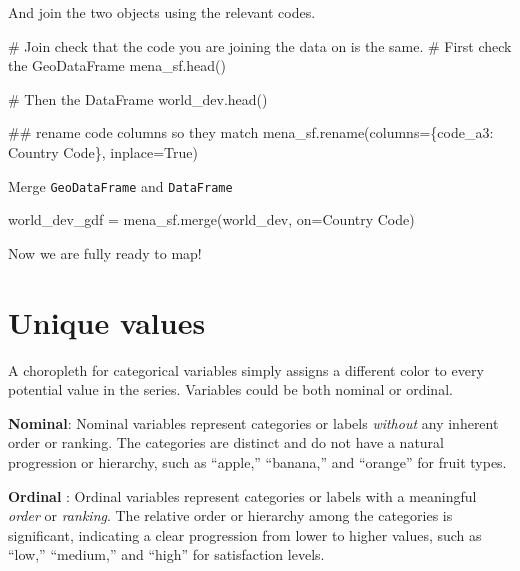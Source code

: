 \documentclass[
  letterpaper,
  DIV=11,
  numbers=noendperiod]{scrreprt}
\newenvironment{Shaded}{\begin{snugshade}}{\end{snugshade}}
\newcommand{\CommentTok}[1]{\textcolor[rgb]{0.37,0.37,0.37}{#1}}
\newcommand{\NormalTok}[1]{\textcolor[rgb]{0.00,0.23,0.31}{#1}}
\newcommand{\OperatorTok}[1]{\textcolor[rgb]{0.37,0.37,0.37}{#1}}
\newcommand{\StringTok}[1]{\textcolor[rgb]{0.13,0.47,0.30}{#1}}
\newcommand{\VariableTok}[1]{\textcolor[rgb]{0.07,0.07,0.07}{#1}}
\begin{document}
And join the two objects using the relevant codes.

\begin{Shaded}
\begin{Highlighting}[]
\CommentTok{\# Join check that the code you are joining the data on is the same.}
\CommentTok{\# First check the GeoDataFrame}
\NormalTok{mena\_sf.head()}

\CommentTok{\# Then the DataFrame}
\NormalTok{world\_dev.head()}

\CommentTok{\#\# rename code columns so they match}
\NormalTok{mena\_sf.rename(columns}\OperatorTok{=}\NormalTok{\{}\StringTok{\textquotesingle{}code\_a3\textquotesingle{}}\NormalTok{: }\StringTok{\textquotesingle{}Country Code\textquotesingle{}}\NormalTok{\}, inplace}\OperatorTok{=}\VariableTok{True}\NormalTok{)}
\end{Highlighting}
\end{Shaded}

Merge \texttt{GeoDataFrame} and \texttt{DataFrame}

\begin{Shaded}
\begin{Highlighting}[]
\NormalTok{world\_dev\_gdf }\OperatorTok{=}\NormalTok{ mena\_sf.merge(world\_dev, on}\OperatorTok{=}\StringTok{\textquotesingle{}Country Code\textquotesingle{}}\NormalTok{)}
\end{Highlighting}
\end{Shaded}

Now we are fully ready to map!

\section*{Unique values}\label{unique-values}


A choropleth for categorical variables simply assigns a different color
to every potential value in the series. Variables could be both nominal
or ordinal.

\textbf{Nominal}: Nominal variables represent categories or labels
\emph{without} any inherent order or ranking. The categories are
distinct and do not have a natural progression or hierarchy, such as
``apple,'' ``banana,'' and ``orange'' for fruit types.

\textbf{Ordinal} : Ordinal variables represent categories or labels with
a meaningful \emph{order} or \emph{ranking}. The relative order or
hierarchy among the categories is significant, indicating a clear
progression from lower to higher values, such as ``low,'' ``medium,''
and ``high'' for satisfaction levels.
\end{document}
